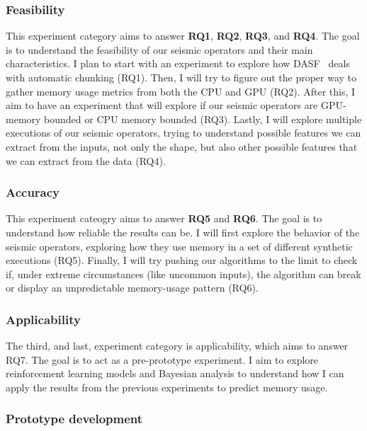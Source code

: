 \subsubsection{Feasibility}
\label{subsubsec:feasibility-experiments}

This experiment category aims to answer \textbf{RQ1}, \textbf{RQ2}, \textbf{RQ3}, and \textbf{RQ4}.
The goal is to understand the feasibility of our seismic operators and their main characteristics.
I plan to start with an experiment to explore how \ac{DASF}~\cite{dasf} deals with automatic chunking (RQ1).
Then, I will try to figure out the proper way to gather memory usage metrics from both the \ac{CPU} and \ac{GPU} (RQ2).
After this, I aim to have an experiment that will explore if our seismic operators are \ac{GPU}-memory bounded or \ac{CPU} memory bounded (RQ3).
Lastly, I will explore multiple executions of our seismic operators, trying to understand possible features we can extract from the inputs, not only the shape, but also other possible features that we can extract from the data (RQ4).

\subsubsection{Accuracy}
\label{subsubsec:accuracy-experiments}

This experiment cateogry aims to answer \textbf{RQ5} and \textbf{RQ6}.
The goal is to understand how reliable the results can be.
I will first explore the behavior of the seismic operators, exploring how they use memory in a set of different synthetic executions (RQ5).
Finally, I will try pushing our algorithms to the limit to check if, under extreme circumstances (like uncommon inputs), the algorithm can break or display an unpredictable memory-usage pattern (RQ6).

\subsubsection{Applicability}
\label{subsubsec:applicability-experiments}

The third, and last, experiment category is applicability, which aims to answer RQ7.
The goal is to act as a pre-prototype experiment.
I aim to explore reinforcement learning models and Bayesian analysis to understand how I can apply the results from the previous experiments to predict memory usage.

\subsubsection{Prototype development}


